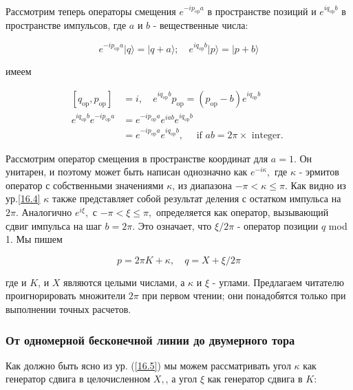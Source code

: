 \documentclass[main.tex]{subfiles}
\begin{document}
Рассмотрим теперь операторы смещения $e^{-i p_{\mathrm{op}} a}$ в пространстве позиций и $e^{i q_{\mathrm{op}} b}$ в пространстве импульсов, где $a$ и $b$ - вещественные числа:

\begin{equation}\label{16.4}
e^{-i p_{\mathrm{op}} a}|q\rangle=|q+a\rangle ; \quad e^{i q_{\mathrm{op}} b}|p\rangle=|p+b\rangle
\end{equation}

имеем

\begin{equation}\label{16.5}
\begin{aligned}
\left[q_{\mathrm{op}}, p_{\mathrm{op}}\right] &=i, \quad e^{i q_{\mathrm{op}} b} p_{\mathrm{op}}=\left(p_{\mathrm{op}}-b\right) e^{i q_{\mathrm{op}} b} \\
e^{i q_{\mathrm{op}} b} e^{-i p_{\mathrm{op}} a} &=e^{-i p_{\mathrm{op}} a} e^{i a b} e^{i q_{\mathrm{op}} b} \\
&=e^{-i p_{\mathrm{op}} a} e^{i q_{\mathrm{op}} b}, \quad \text { if } a b=2 \pi \times \text { integer. }
\end{aligned}
\end{equation}

Рассмотрим оператор смещения в пространстве координат для $a=1 .$ Он унитарен, и поэтому может быть написан однозначно как $e^{-i \kappa},$ где $\kappa$ - эрмитов оператор с собственными значениями $\kappa$, из диапазона $-\pi<\kappa \leq \pi .$ Как видно из ур.\ref{16.4} $\kappa$ также представляет собой результат деления с остатком импульса на $2 \pi .$ Аналогично $e^{i \xi},$ с $-\pi<\xi \leq \pi,$ определяется как оператор, вызывающий сдвиг импульса на шаг $b=2 \pi .$ Это означает, что $\xi / 2 \pi$ - оператор позиции $q$ mod 1. Мы пишем

\begin{equation}\label{16.6}
p=2 \pi K+\kappa, \quad q=X+\xi / 2 \pi
\end{equation}

где и $K$, и $X$ являются целыми числами, а $\kappa$ и $\xi$ - углами. Предлагаем читателю проигнорировать множители $2 \pi$ при первом чтении; они понадобятся только при выполнении точных расчетов.

\subsubsection{От одномерной бесконечной линии до двумерного тора}\label{ch16.1.1}

Как должно быть ясно из ур. (\ref{16.5}) мы можем рассматривать угол $\kappa$ как генератор сдвига в целочисленном $X,$, а угол $\xi$ как генератор сдвига в $K:$
\end{document}
